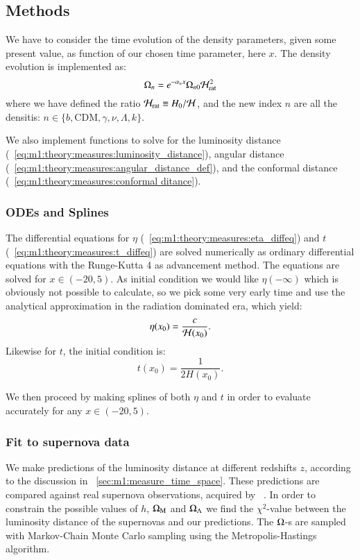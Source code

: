 \subsection{Methods}\label{sec:m1:methods}
    We have to consider the time evolution of the density parameters, given some present value, as function of our chosen time parameter, here $x$. The density evolution is implemented as:
    \begin{equation}\label{eq:m1:methods:initial:density_evolution}
        \Omega_n = e^{-\alpha_nx}\Omega_{n0}\mathcal{H}_\mathrm{rat}^2
    \end{equation}
    where we have defined the ratio $\mathcal{H}_\mathrm{rat} \equiv H_0/\mathcal{H}$, and the new index $n$ are all the densitis: $n\in\{b, \mathrm{CDM}, \gamma, \nu, \Lambda, k\}$.

    We also implement functions to solve for the luminosity distance (~\cref{eq:m1:theory:measures:luminosity_distance}), angular distance (~\cref{eq:m1:theory:measures:angular_distance_def}), and the conformal distance (~\cref{eq:m1:theory:measures:conformal ditance}).


\subsubsection{ODEs and Splines}
    The differential equations for $\eta$ (~\cref{eq:m1:theory:measures:eta_diffeq}) and $t$ (~\cref{eq:m1:theory:measures:t_diffeq}) are solved numerically as ordinary differential equations with the Runge-Kutta 4 as advancement method. The equations are solved for $x\in(-20,5)$. As initial condition we would like $\eta(-\infty)$ which is obviously not possible to calculate, so we pick some very early time and use the analytical approximation in the radiation dominated era, which yield:
    \begin{equation}\label{eq:m1:methods:odes:eta_initial}
        \eta(x_0) = \frac{c}{\mathcal{H}(x_0)}.
    \end{equation}
    Likewise for $t$, the initial condition is:
    \begin{equation}\label{eq:m1:methods:odes:t_initial}
        t(x_0) = \frac{1}{2H(x_0)}.
    \end{equation}
    
    We then proceed by making splines of both $\eta$ and $t$ in order to evaluate accurately for any $x\in(-20,5)$. 


\subsubsection{Fit to supernova data}\label{sec:m1:methods:fit}
    We make predictions of the luminosity distance at different redshifts $z$, according to the discussion in ~\cref{sec:m1:measure_time_space}. These predictions are compared against real supernova observations, acquired by ~\cite{Betoule_2014}. In order to constrain the possible values of $h$, $\Omega_\mathrm{M}$ and $\Omega_\Lambda$ we find the $\chi^2$-value between the luminosity distance of the supernovas and our predictions. The $\Omega$-s are sampled with Markov-Chain Monte Carlo sampling using the Metropolis-Hastings algorithm. 
    
